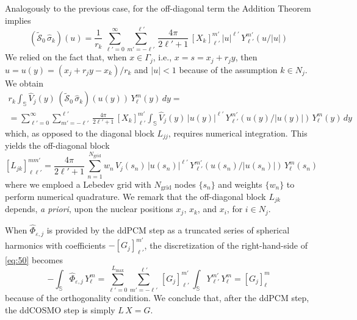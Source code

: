 \documentclass[aip,jcp,a4paper,11pt]{revtex4-1}
\newcommand{\cS}{\mathcal{S}}
\begin{document}
Analogously to the previous case, for the off-diagonal term the Addition Theorem implies
\[
(\tilde{\cS}_0 \, \hat{\sigma}_k)(u) = \frac{1}{r_k} \, \sum_{\ell'= 0}^{\infty} \sum_{m' = -\ell'}^{\ell'} \, \frac{4\pi}{2\ell' + 1}\, [X_k]_{\ell'}^{m'} \, |u|^{\ell'} \, Y_{\ell'}^{m'}(u/|u|)
\]
We relied on the fact that, when $x \in \Gamma_j$, i.e., $x = s = x_j + r_j y$, then $u = u(y) = (x_j + r_j y -x_k)/r_k$ and $|u| < 1$ because of the assumption $k \in N_j$. We obtain
\begin{multline*}
 r_k \int_\mathbb{S} \hat{V}_j(y) \, (\tilde{\cS}_0 \, \hat{\sigma}_k)(u(y)) \, Y_\ell^m(y) \, dy = \\
=  \sum_{\ell'= 0}^{\infty} \sum_{m' = -\ell'}^{\ell'} \, \frac{4\pi}{2\ell' + 1}\, [X_k]_{\ell'}^{m'} \int_\mathbb{S} \hat{V}_j(y) \, |u(y)|^{\ell'} \, Y_{\ell'}^{m'}(u(y)/|u(y)|) \, Y_\ell^m(y) \, dy
\end{multline*}
which, as opposed to the diagonal block $L_{jj}$, requires numerical integration.
This yields the off-diagonal block
\begin{equation}\label{eq:62}
[L_{jk}]_{\ell \ell'}^{m m'} =  \frac{4\pi}{2\ell' + 1}\, \sum_{n = 1}^{N_\text{grid}} w_n \, \hat{V}_j(s_n) \, |u(s_n)|^{\ell'} \, Y_{\ell'}^{m'}(u(s_n)/|u(s_n)|) \, Y_\ell^m(s_n)
\end{equation}
where we emploed a Lebedev grid with $N_\text{grid}$ nodes $\{s_n\}$ and weights $\{ w_n \}$ to perform numerical quadrature. We remark that the off-diagonal block $L_{jk}$ depends, \emph{a priori}, upon the nuclear positions $x_j$, $x_k$, and $x_i$, for $i \in N_j$.

When $\hat{\Phi}_{\varepsilon,j}$ is provided by the ddPCM step as a truncated series of spherical harmonics with coefficients $-[G_j]_{\ell'}^{m'}$, the discretization of the right-hand-side of \eqref{eq:50} becomes
\[
- \int_\mathbb{S} \hat{\Phi}_{\varepsilon,j} \, Y_\ell^m =  \sum_{\ell'= 0}^{L_\text{max}} \sum_{m' = -\ell'}^{\ell'} \, [G_j]_{\ell'}^{m'} \,  \int_{\mathbb{S}}  Y_{\ell'}^{m'} \, Y_\ell^m =  [G_j]_\ell^m
\]
because of the orthogonality condition. We conclude that, after the ddPCM step, the ddCOSMO step is simply $L \, X = G$.
 
\end{document}
